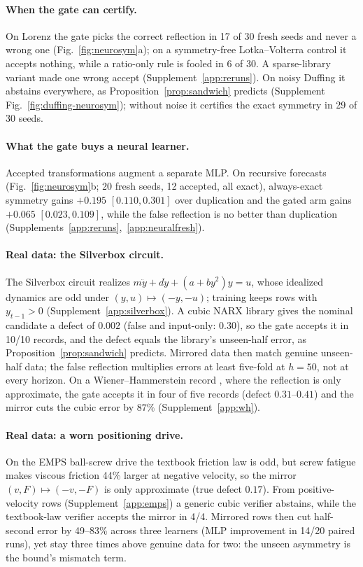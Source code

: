 \documentclass{l4dc2027}
\begin{document}
\paragraph{When the gate can certify.} On Lorenz the gate picks the correct reflection in 17 of 30 fresh seeds and never a wrong one (Fig.~\ref{fig:neurosym}a); on a symmetry-free Lotka--Volterra control it accepts nothing, while a ratio-only rule is fooled in 6 of 30. A sparse-library variant made one wrong accept (Supplement~\ref{app:reruns}). On noisy Duffing it abstains everywhere, as Proposition~\ref{prop:sandwich} predicts (Supplement Fig.~\ref{fig:duffing-neurosym}); without noise it certifies the exact symmetry in 29 of 30 seeds.


\paragraph{What the gate buys a neural learner.} Accepted transformations augment a separate MLP. On recursive forecasts (Fig.~\ref{fig:neurosym}b; 20 fresh seeds, 12 accepted, all exact), always-exact symmetry gains $+0.195$ $[0.110,0.301]$ over duplication and the gated arm gains $+0.065$ $[0.023,0.109]$, while the false reflection is no better than duplication (Supplements~\ref{app:reruns},~\ref{app:neuralfresh}).

\paragraph{Real data: the Silverbox circuit.} The Silverbox circuit \citep{wigren2013three} realizes $m\ddot y+d\dot y+(a+by^2)y=u$, whose idealized dynamics are odd under $(y,u)\mapsto(-y,-u)$; training keeps rows with $y_{t-1}>0$ (Supplement~\ref{app:silverbox}). A cubic NARX library gives the nominal candidate a defect of $0.002$ (false and input-only: $0.30$), so the gate accepts it in 10/10 records, and the defect equals the library's unseen-half error, as Proposition~\ref{prop:sandwich} predicts. Mirrored data then match genuine unseen-half data; the false reflection multiplies errors at least five-fold at $h=50$, not at every horizon. On a Wiener--Hammerstein record \citep{schoukens2009wh}, where the reflection is only approximate, the gate accepts it in four of five records (defect $0.31$--$0.41$) and the mirror cuts the cubic error by $87\%$ (Supplement~\ref{app:wh}).

\paragraph{Real data: a worn positioning drive.} On the EMPS ball-screw drive \citep{janot2019emps} the textbook friction law is odd, but screw fatigue makes viscous friction 44\% larger at negative velocity, so the mirror $(v,F)\mapsto(-v,-F)$ is only approximate (true defect $0.17$). From positive-velocity rows (Supplement~\ref{app:emps}) a generic cubic verifier abstains, while the textbook-law verifier accepts the mirror in 4/4. Mirrored rows then cut half-second error by 49--83\% across three learners (MLP improvement in 14/20 paired runs), yet stay three times above genuine data for two: the unseen asymmetry is the bound's mismatch term.
\end{document}
